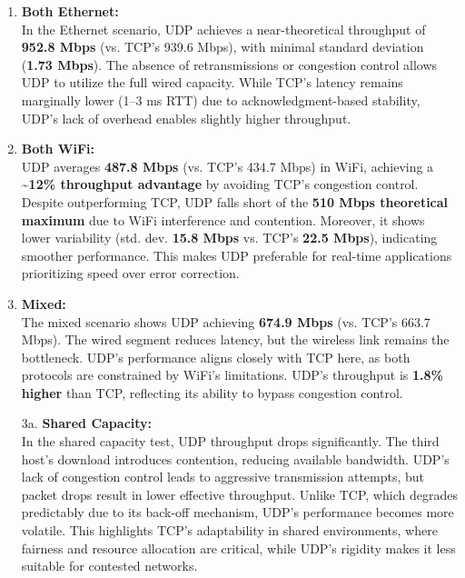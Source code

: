         \begin{enumerate}
            \item \textbf{Both Ethernet:} \\
                In the Ethernet scenario, UDP achieves a near-theoretical throughput of \textbf{952.8 Mbps} (vs. TCP’s 939.6 Mbps), with minimal standard deviation (\textbf{1.73 Mbps}). The absence of retransmissions or congestion control allows UDP to utilize the full wired capacity. While TCP’s latency remains marginally lower (1–3 ms RTT) due to acknowledgment-based stability, UDP’s lack of overhead enables slightly higher throughput.
            \\

            \item \textbf{Both WiFi:} \\
            UDP averages \textbf{487.8 Mbps} (vs. TCP’s 434.7 Mbps) in WiFi, achieving a \textbf{\textasciitilde 12\% throughput advantage} by avoiding TCP’s congestion control. Despite outperforming TCP, UDP falls short of the \textbf{510 Mbps theoretical maximum} due to WiFi interference and contention. Moreover, it shows lower variability (std. dev. \textbf{15.8 Mbps} vs. TCP’s \textbf{22.5 Mbps}), indicating smoother performance. This makes UDP preferable for real-time applications prioritizing speed over error correction.
            \\

            \item \textbf{Mixed:} \\
                The mixed scenario shows UDP achieving \textbf{674.9 Mbps} (vs. TCP’s 663.7 Mbps). The wired segment reduces latency, but the wireless link remains the bottleneck. UDP’s performance aligns closely with TCP here, as both protocols are constrained by WiFi’s limitations. UDP’s throughput is \textbf{1.8\% higher} than TCP, reflecting its ability to bypass congestion control.
            \\

            \item[3a.] \textbf{Shared Capacity:} \\
                In the shared capacity test, UDP throughput drops significantly. The third host’s download introduces contention, reducing available bandwidth. UDP’s lack of congestion control leads to aggressive transmission attempts, but packet drops result in lower effective throughput. Unlike TCP, which degrades predictably due to its back-off mechanism, UDP’s performance becomes more volatile. This highlights TCP’s adaptability in shared environments, where fairness and resource allocation are critical, while UDP’s rigidity makes it less suitable for contested networks.
        \end{enumerate}
    